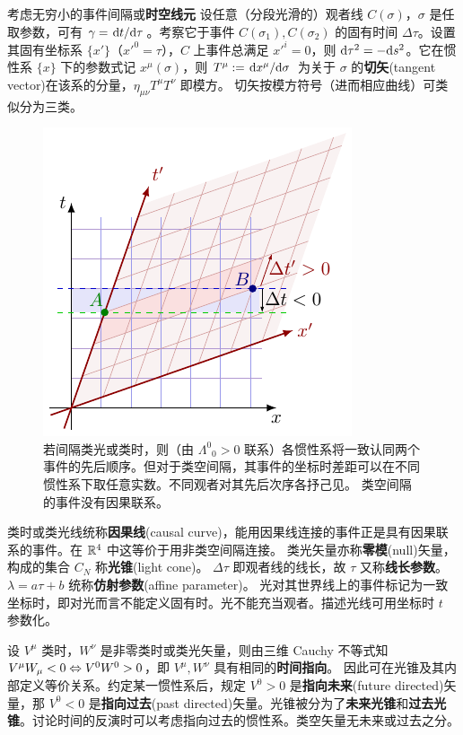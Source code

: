 考虑无穷小的事件间隔或\textbf{时空线元}
设任意（分段光滑的）观者线 $C(\sigma)$，$\sigma$ 是任取参数，可有 $\gamma=\dv*{t}{\tau}$。考察它于事件 $C(\sigma_1),C(\sigma_2)$ 的固有时间 $\Delta\tau$。设置其固有坐标系 $\{x'\}$（$x'^0=\tau$），$C$ 上事件总满足 $x'^i=0$，则 $\dd\tau^2=-\dd s^2$。它在惯性系 $\{x\}$ 下的参数式记 $x^\mu(\sigma)$，则
$T^\mu:=\dv*{x^\mu}{\sigma}$ 为关于 $\sigma$ 的\textbf{切矢}(tangent vector)在该系的分量，$\eta_{\mu\nu}T^\mu T^\nu$ 即模方。
切矢按模方符号（进而相应曲线）可类似分为三类。
\begin{figure}[t]
    \centering
    \includegraphics[width=.35\textwidth]{fig/chpt01/order.pdf}
    \caption{\small 若间隔类光或类时，则（由 $\Lambda^0{}_0>0$ 联系）各惯性系将一致认同两个事件的先后顺序。但对于类空间隔，其事件的坐标时差距可以在不同惯性系下取任意实数。不同观者对其先后次序各抒己见。
    类空间隔的事件没有因果联系。}
    \label{fig:spacelike}
\end{figure}
类时或类光线统称\textbf{因果线}(causal curve)，能用因果线连接的事件正是具有因果联系的事件。在 $\mathbb{R}^4$ 中这等价于用非类空间隔连接。
类光矢量亦称\textbf{零模}(null)矢量，构成的集合 $C_N$ 称\textbf{光锥}(light cone)。
$\Delta\tau$ 即观者线的线长，故 $\tau$ 又称\textbf{线长参数}。$\lambda=a\tau+b$ 统称\textbf{仿射参数}(affine parameter)。
光对其世界线上的事件标记为一致坐标时，即对光而言不能定义固有时。光不能充当观者。描述光线可用坐标时 $t$ 参数化。

设 $V^\mu$ 类时，$W^\nu$ 是非零类时或类光矢量，则由三维 Cauchy 不等式知 $V^\mu W_\mu<0\Leftrightarrow V^{0} W^{0}>0$，即 $V^\mu,W^\nu$ 具有相同的\textbf{时间指向}。
因此可在光锥及其内部定义等价关系。约定某一惯性系后，规定 $V^0>0$ 是\textbf{指向未来}(future directed)矢量，那 $V^0<0$ 是\textbf{指向过去}(past directed)矢量。光锥被分为了\textbf{未来光锥}和\textbf{过去光锥}。讨论时间的反演时可以考虑指向过去的惯性系。类空矢量无未来或过去之分。

